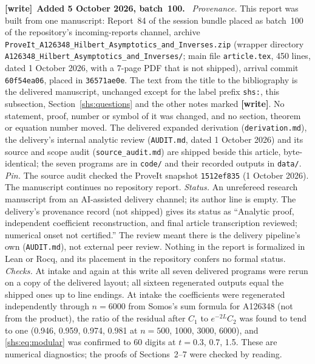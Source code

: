 \documentclass[11pt]{article}
\theoremstyle{definition}
\theoremstyle{plain}
\newenvironment{writenote}[1][]{\par\smallskip\begingroup\small
 \noindent\textbf{[write]}\if\relax\detokenize{#1}\relax\else~\textbf{#1.}\fi\ }%
 {\par\endgroup\smallskip}
\begin{document}
\begin{writenote}[Added 5 October 2026, batch~100]
\emph{Provenance.} This report was built from one manuscript: Report~84
of the session bundle placed as batch~100 of the repository's
incoming-reports channel, archive
\nolinkurl{ProveIt_A126348_Hilbert_Asymptotics_and_Inverses.zip}
(wrapper directory \nolinkurl{A126348_Hilbert_Asymptotics_and_Inverses/};
main file \nolinkurl{article.tex}, 450 lines, dated 1 October 2026, with a
7-page PDF that is not shipped), arrival commit \texttt{60f54ea06}, placed
in \texttt{36571ae0e}. The text from the title to the bibliography is the
delivered manuscript, unchanged except for the label prefix
\texttt{shs:}, this subsection, Section~\ref{shs:questions} and the other
notes marked \textbf{[write]}. No statement, proof, number or symbol of it
was changed, and no section, theorem or equation number moved. The
delivered expanded derivation (\nolinkurl{derivation.md}), the delivery's
internal analytic review (\nolinkurl{AUDIT.md}, dated 1 October 2026) and
its source and scope audit (\nolinkurl{source_audit.md}) are shipped
beside this article, byte-identical; the seven programs are in
\nolinkurl{code/} and their recorded outputs in \nolinkurl{data/}.
\emph{Pin.} The source audit checked the ProveIt snapshot
\texttt{1512ef835} (1 October 2026). The manuscript continues no
repository report.
\emph{Status.} An unrefereed research manuscript from an AI-assisted
delivery channel; its author line is empty. The delivery's provenance
record (not shipped) gives its status as ``Analytic proof, independent
coefficient reconstruction, and final article transcription reviewed;
numerical onset not certified.'' The review meant there is the delivery
pipeline's own (\nolinkurl{AUDIT.md}), not external peer review. Nothing
in the report is formalized in Lean or Rocq, and its placement in the
repository confers no formal status.
\emph{Checks.} At intake and again at this write all seven delivered
programs were rerun on a copy of the delivered layout; all sixteen
regenerated outputs equal the shipped ones up to line endings. At intake
the coefficients were regenerated independently through $n=6000$ from
Somos's sum formula for A126348 (not from the product), the ratio of the
residual after $C_1$ to $e^{-2L}C_2$ was found to tend to one (0.946,
0.959, 0.974, 0.981 at $n=500$, 1000, 3000, 6000), and
\eqref{shs:eq:modular} was confirmed to 60 digits at $t=0.3$, 0.7, 1.5.
These are numerical diagnostics; the proofs of Sections~2--7 were checked
by reading.
\end{writenote}
\end{document}
